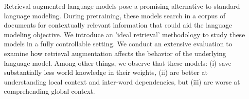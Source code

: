Retrieval-augmented language models pose a promising alternative to standard language modeling. During pretraining, these models search in a corpus of documents for contextually relevant information that could aid the language modeling objective. We introduce an 'ideal retrieval' methodology to study these models in a fully controllable setting. We conduct an extensive evaluation to examine how retrieval augmentation affects the behavior of the underlying language model. Among other things, we observe that these models: (i) save substantially less world knowledge in their weights, (ii) are better at understanding local context and inter-word dependencies, but (iii) are worse at comprehending global context.